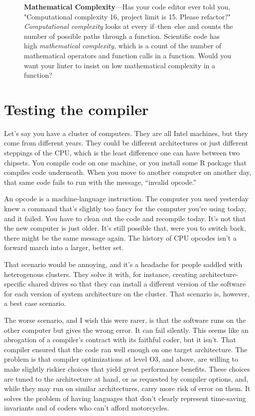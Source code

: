 \documentclass[fleqn,10pt]{olplainarticle}
\newenvironment{callout}
{
\begin{figure}
\begin{center}
\begin{minipage}{0.9\textwidth}
\begin{framed}
}
{
\end{framed}
\end{minipage}
\end{center}
\end{figure}
}
\begin{document}
\begin{callout}
\textbf{Mathematical Complexity}---Has your code editor ever told you,
"Computational complexity 16, project limit is 15. Please refactor?"
\emph{Computational complexity} looks at every if--then--else and counts the
number of possible paths through a function.
Scientific code has high \emph{mathematical complexity,\/} which is a
count of the number of mathematical operators and function calls in
a function. Would you want your linter to insist on low mathematical complexity in
a function?
\end{callout}


\section{Testing the compiler}\label{sec:test-compiler}

Let's say you have a cluster of computers. They are all Intel machines,
but they come from different years. They could be different architectures
or just different steppings of the CPU, which is the least difference
one can have between two chipsets. You compile code on one machine,
or you install some R package that compiles code underneath. When
you move to another computer on another day, that same code fails
to run with the message, ``invalid opcode.''

An opcode is a machine-language instruction. The computer you used
yesterday knew a command that's slightly too fancy for the computer
you're using today, and it failed. You have to clean out the code
and recompile today. It's not that the new computer is just older.
It's still possible that, were you to switch back, there might be
the same message again. The history of CPU opcodes isn't a forward
march into a larger, better set.

That scenario would be annoying, and it's a headache for people
saddled with heterogenous clusters. They solve it with, for instance,
creating architecture-specific shared drives so that they can
install a different version of the software for each version of
system architecture on the cluster. That scenario is, however, a
best case scenario.

The worse scenario, and I wish this were rarer, is that the
software runs on the other computer but gives the wrong error.
It can fail silently. This seems like an abrogation of a compiler's
contract with its faithful coder, but it isn't. That compiler
ensured that the code ran well enough on one target architecture.
The problem is that compiler optimizations at level O3, and above,
are willing to make slightly riskier choices that yield great
performance benefits. These choices are tuned to the architecture
at hand, or as requested by compiler options, and, while they may
run on similar architectures, carry more risk of error on them.
It solves the problem of having languages
that don't clearly represent time-saving invariants and of coders
who can't afford motorcycles.
\end{document}
